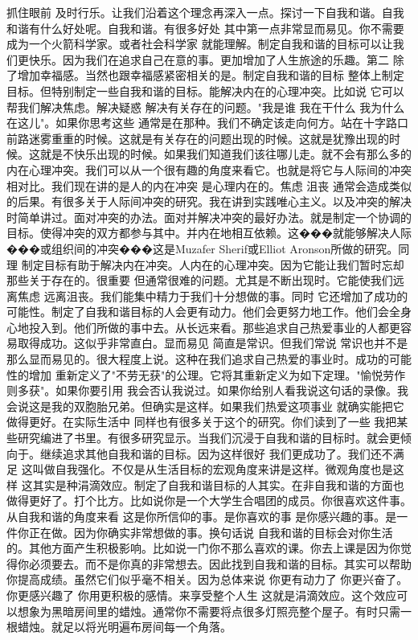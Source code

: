 抓住眼前 及时行乐。让我们沿着这个理念再深入一点。探讨一下自我和谐。自我和谐有什么好处呢。自我和谐。有很多好处 其中第一点非常显而易见。你不需要成为一个火箭科学家。或者社会科学家 就能理解。制定自我和谐的目标可以让我们更快乐。因为我们在追求自己在意的事。更加增加了人生旅途的乐趣。第二 除了增加幸福感。当然也跟幸福感紧密相关的是。制定自我和谐的目标 整体上制定目标。但特别制定一些自我和谐的目标。能解决内在的心理冲突。比如说 它可以帮我们解决焦虑。解决疑惑 解决有关存在的问题。"我是谁 我在干什么 我为什么在这儿"。如果你思考这些 通常是在那种。我们不确定该走向何方。站在十字路口 前路迷雾重重的时候。这就是有关存在的问题出现的时候。这就是犹豫出现的时候。这就是不快乐出现的时候。如果我们知道我们该往哪儿走。就不会有那么多的内在心理冲突。我们可以从一个很有趣的角度来看它。也就是将它与人际间的冲突相对比。我们现在讲的是人的内在冲突 是心理内在的。焦虑 沮丧 通常会造成类似的后果。有很多关于人际间冲突的研究。我在讲到实践唯心主义。以及冲突的解决时简单讲过。面对冲突的办法。面对并解决冲突的最好办法。就是制定一个协调的目标。使得冲突的双方都参与其中。并内在地相互依赖。这���就能够解决人际���或组织间的冲突���这是Muzafer Sherif或Elliot Aronson所做的研究。同理 制定目标有助于解决内在冲突。人内在的心理冲突。因为它能让我们暂时忘却那些关于存在的。很重要 但通常很难的问题。尤其是不断出现时。它能使我们远离焦虑 远离沮丧。我们能集中精力于我们十分想做的事。同时 它还增加了成功的可能性。制定了自我和谐目标的人会更有动力。他们会更努力地工作。他们会全身心地投入到。他们所做的事中去。从长远来看。那些追求自己热爱事业的人都更容易取得成功。这似乎非常直白。显而易见 简直是常识。但我们常说 常识也并不是那么显而易见的。很大程度上说。这种在我们追求自己热爱的事业时。成功的可能性的增加 重新定义了"不劳无获"的公理。它将其重新定义为如下定理。"愉悦劳作则多获"。如果你要引用 我会否认我说过。如果你给别人看我说这句话的录像。我会说这是我的双胞胎兄弟。但确实是这样。如果我们热爱这项事业 就确实能把它做得更好。在实际生活中 同样也有很多关于这个的研究。你们读到了一些 我把某些研究编进了书里。有很多研究显示。当我们沉浸于自我和谐的目标时。就会更倾向于。继续追求其他自我和谐的目标。因为这样很好 我们更成功了。我们还不满足 这叫做自我强化。不仅是从生活目标的宏观角度来讲是这样。微观角度也是这样 这其实是种涓滴效应。制定了自我和谐目标的人其实。在非自我和谐的方面也做得更好了。打个比方。比如说你是一个大学生合唱团的成员。你很喜欢这件事。从自我和谐的角度来看 这是你所信仰的事。是你喜欢的事 是你感兴趣的事。是一件你正在做。因为你确实非常想做的事。换句话说 自我和谐的目标会对你生活的。其他方面产生积极影响。比如说一门你不那么喜欢的课。你去上课是因为你觉得你必须要去。而不是你真的非常想去。因此找到自我和谐的目标。其实可以帮助你提高成绩。虽然它们似乎毫不相关。因为总体来说 你更有动力了 你更兴奋了。你更感兴趣了 你用更积极的感情。来享受整个人生 这就是涓滴效应。这个效应可以想象为黑暗房间里的蜡烛。通常你不需要将点很多灯照亮整个屋子。有时只需一根蜡烛。就足以将光明遍布房间每一个角落。 

